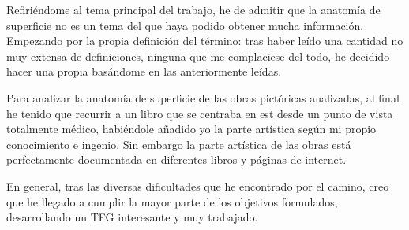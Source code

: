 Refiriéndome al tema principal del trabajo, he de admitir que la anatomía de superficie no es un tema del que haya podido obtener mucha información. Empezando por la propia definición del término: tras haber leído una cantidad no muy extensa de definiciones, ninguna que me complaciese del todo, he decidido hacer una propia basándome en las anteriormente leídas.

Para analizar la anatomía de superficie de las obras pictóricas analizadas, al final he tenido que recurrir a un libro que se centraba en est desde un punto de vista totalmente médico, habiéndole añadido yo la parte artística según mi propio conocimiento e ingenio. Sin embargo la parte artística de las obras está perfectamente documentada en diferentes libros y páginas de internet.

En general, tras las diversas dificultades que he encontrado por el camino, creo que he llegado a cumplir la mayor parte de los objetivos formulados, desarrollando un TFG interesante y muy trabajado.